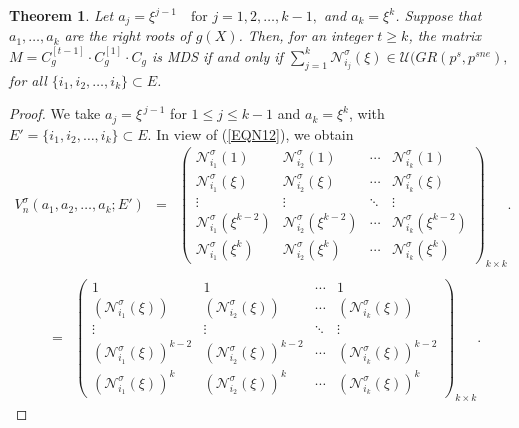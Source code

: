 \documentclass[11pt]{article}
\newtheorem{theorem}{Theorem}
\begin{document}
 \begin{theorem}\label{Theorem 9}
     Let $a_j = \xi^{j-1} \quad \text{for } j =  1,2,\ldots,k-1,$ and $a_k=\xi^k$.  
Suppose that $a_1, \dots, a_k$ are the right roots of $g(X)$. 	Then, for an integer $t\geq k$, the matrix 
 	$
 	M = C^{[t-1]}_g \cdot C^{[1]}_g \cdot C_g
 	$
 	is MDS if and only if $\sum_{j=1}^{k}\mathcal{N}^\sigma_{i_j}(\xi)\in \mathcal{U}(GR(p^s,p^{sne}),$ for all $\{i_1,i_2,\dots,i_k\} \subset E$.
    \end{theorem}
    \begin{proof}
       We take $a_j=\xi^{\,j-1}$ for $1\leq j \leq k-1$ and $a_k=\xi^k$, with $E'=\{i_1,i_2,\dots,i_k\}\subset E$. In view of (\ref{EQN12}), we obtain
\begin{eqnarray*}
    V^\sigma_n(a_1,a_2,\dots,a_k;E')&=&\begin{pmatrix}
			\mathcal{N}^\sigma_{i_1}(1) & \mathcal{N}^\sigma_{i_2}(1)& \cdots & \mathcal{N}^\sigma_{i_k}(1) \\
			\mathcal{N}^\sigma_{i_1}(\xi) & \mathcal{N}^\sigma_{i_2}(\xi)&\cdots & \mathcal{N}^\sigma_{i_k}(\xi) \\
			\vdots &\vdots& \ddots & \vdots \\
			\mathcal{N}^\sigma_{i_1}(\xi^{{k-2}}) &\mathcal{N}^\sigma_{i_2}(\xi^{{k-2}})& \cdots & \mathcal{N}^\sigma_{i_k}(\xi^{{k-2}})\\
            \mathcal{N}^\sigma_{i_1}(\xi^{{k}}) &\mathcal{N}^\sigma_{i_2}(\xi^{{k}})& \cdots & \mathcal{N}^\sigma_{i_k}(\xi^{{k}})
		\end{pmatrix}_{k\times k}.\\
\end{eqnarray*}
        \begin{eqnarray*}
		&=&	\begin{pmatrix}
		1 & 1& \cdots & 	1\\
			(\mathcal{N}^\sigma_{i_1}(\xi)) & (\mathcal{N}^\sigma_{i_2}(\xi))&\cdots & (\mathcal{N}^\sigma_{i_k}(\xi)) \\
			\vdots &\vdots& \ddots & \vdots \\
			(\mathcal{N}^\sigma_{i_1}(\xi))^{{k-2}} &(\mathcal{N}^\sigma_{i_2}(\xi))^{{k-2}}& \cdots & (\mathcal{N}^\sigma_{i_k}(\xi))^{{k-2}}\\
            (\mathcal{N}^\sigma_{i_1}(\xi))^{{k}} &(\mathcal{N}^\sigma_{i_2}(\xi))^{{k}}& \cdots & (\mathcal{N}^\sigma_{i_k}(\xi))^{{k}}
		\end{pmatrix}_{k\times k}.
        \end{eqnarray*}
        

\end{proof}
\end{document}
